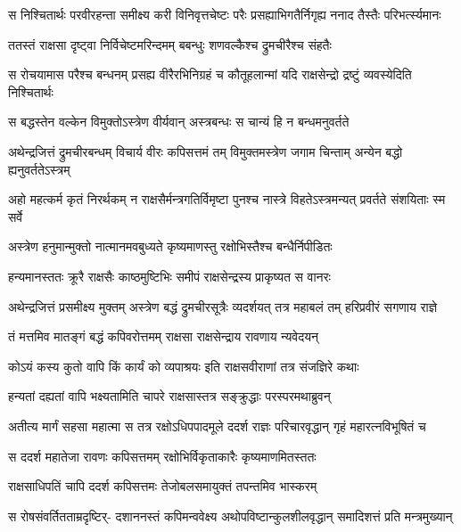 \fourlineindentedshloka
{स निश्चितार्थः परवीरहन्ता}
{समीक्ष्य करी विनिवृत्तचेष्टः}
{परैः प्रसह्याभिगतैर्निगृह्य}
{ननाद तैस्तैः परिभर्त्स्यमानः} %

\twolineshloka
{ततस्तं राक्षसा दृष्ट्वा निर्विचेष्टमरिन्दमम्}
{बबन्धुः शणवल्कैश्च द्रुमचीरैश्च संहतैः} %

\fourlineindentedshloka
{स रोचयामास परैश्च बन्धनम्}
{प्रसह्य वीरैरभिनिग्रहं च}
{कौतूहलान्मां यदि राक्षसेन्द्रो}
{द्रष्टुं व्यवस्येदिति निश्चितार्थः} %

\twolineshloka
{स बद्धस्तेन वल्केन विमुक्तोऽस्त्रेण वीर्यवान्}
{अस्त्रबन्धः स चान्यं हि न बन्धमनुवर्तते} %

\fourlineindentedshloka
{अथेन्द्रजित्तं द्रुमचीरबन्धम्}
{विचार्य वीरः कपिसत्तमं तम्}
{विमुक्तमस्त्रेण जगाम चिन्ताम्}
{अन्येन बद्धो ह्यनुवर्ततेऽस्त्रम्} %

\fourlineindentedshloka
{अहो महत्कर्म कृतं निरर्थकम्}
{न राक्षसैर्मन्त्रगतिर्विमृष्टा}
{पुनश्च नास्त्रे विहतेऽस्त्रमन्यत्}
{प्रवर्तते संशयिताः स्म सर्वे} %

\twolineshloka
{अस्त्रेण हनुमान्मुक्तो नात्मानमवबुध्यते}
{कृष्यमाणस्तु रक्षोभिस्तैश्च बन्धैर्निपीडितः} %

\twolineshloka
{हन्यमानस्ततः क्रूरै राक्षसैः काष्ठमुष्टिभिः}
{समीपं राक्षसेन्द्रस्य प्राकृष्यत स वानरः} %

\fourlineindentedshloka
{अथेन्द्रजित्तं प्रसमीक्ष्य मुक्तम्}
{अस्त्रेण बद्धं द्रुमचीरसूत्रैः}
{व्यदर्शयत् तत्र महाबलं तम्}
{हरिप्रवीरं सगणाय राज्ञे} %

\twolineshloka
{तं मत्तमिव मातङ्गं बद्धं कपिवरोत्तमम्}
{राक्षसा राक्षसेन्द्राय रावणाय न्यवेदयन्} %

\twolineshloka
{कोऽयं कस्य कुतो वापि किं कार्यं को व्यपाश्रयः}
{इति राक्षसवीराणां तत्र संजज्ञिरे कथाः} %

\twolineshloka
{हन्यतां दह्यतां वापि भक्ष्यतामिति चापरे}
{राक्षसास्तत्र सङ्क्रुद्धाः परस्परमथाब्रुवन्} %

\fourlineindentedshloka
{अतीत्य मार्गं सहसा महात्मा}
{स तत्र रक्षोऽधिपपादमूले}
{ददर्श राज्ञः परिचारवृद्धान्}
{गृहं महारत्नविभूषितं च} %

\twolineshloka
{स ददर्श महातेजा रावणः कपिसत्तमम्}
{रक्षोभिर्विकृताकारैः कृष्यमाणमितस्ततः} %

\twolineshloka
{राक्षसाधिपतिं चापि ददर्श कपिसत्तमः}
{तेजोबलसमायुक्तं तपन्तमिव भास्करम्} %

\fourlineindentedshloka
{स रोषसंवर्तितताम्रदृष्टिर्-}
{दशाननस्तं कपिमन्ववेक्ष्य}
{अथोपविष्टान्कुलशीलवृद्धान्}
{समादिशत्तं प्रति मन्त्रमुख्यान्} %

